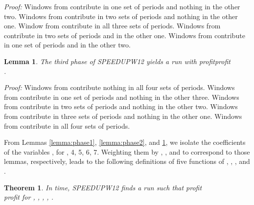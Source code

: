 \documentclass[11pt]{article}
\newtheorem{theorem}{Theorem}[section]
\newtheorem{lemma}{Lemma}[section]
\newcommand\QED{\ifhmode\allowbreak\else\nobreak\fi
\quad\nobreak\medbreak}
\newcommand{\proofstart}{\par\noindent \emph{Proof:} }
\newcommand{\proofend}{\QED\par}
\newenvironment{proof}{\proofstart}{\proofend}
\begin{document}
\begin{proof}
Windows from  contribute  in one set of periods and nothing in the other two.  Windows from  contribute  in two sets of periods and nothing in the other one.  Window from  contribute  in all three sets of periods.  Windows from  contribute  in two sets of periods and  in the other one.  Windows from  contribute  in one set of periods and  in the other two.\end{proof}

\begin{lemma}
\label{lemma:phase3}
The third phase of SPEEDUPW12 yields a run  with profitprofit\\
\hspace*{.2in}.
\end{lemma}

\begin{proof}
Windows from  contribute nothing in all four sets of periods.  Windows from   contribute  in one set of periods and nothing in the other three.   Windows from  contribute  in two sets of periods and nothing in the other two.  Windows from  contribute  in three sets of periods and nothing in the other one.  Windows from  contribute  in all four sets of periods.\end{proof}


\begin{comment}
\begin{theorem}
In  time,
SPEEDUPW12 finds a run  such that profit \\
profit

\hspace{.1in}\\
\hspace*{.3in}
\hspace{.1in}\\
\hspace*{.3in}
\hspace{.1in}\hspace{.1in}

\label{thm:LP}
\end{theorem}
\end{comment}

From Lemmas \ref{lemma:phase1}, \ref{lemma:phase2}, and \ref{lemma:phase3}, we isolate the coefficients  of the variables , for , 4, 5, 6, 7.  Weighting them by , , and  to correspond to those lemmas, respectively, leads to the following definitions of five functions of , , , and .


\begin{theorem}
In  time,
SPEEDUPW12 finds a run  such that profit \\
profit for , , , ,  .
\label{thm:LP}
\end{theorem}
\end{document}
